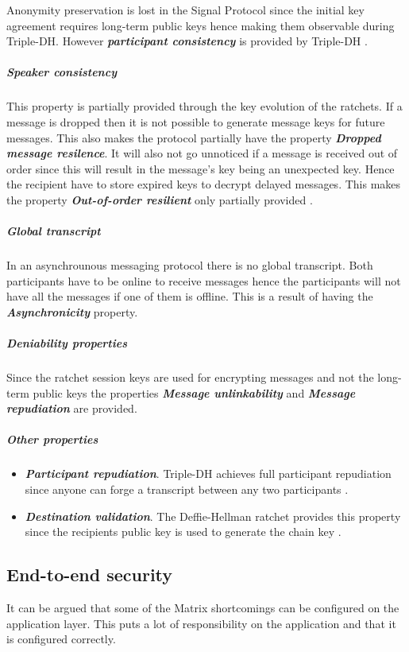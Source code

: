 Anonymity preservation is lost in the Signal Protocol since the initial key agreement requires long-term public keys hence making them observable during Triple-DH. However \textbf{\emph{participant consistency}} is provided by Triple-DH \cite{sok}. %

\subparagraph{Speaker consistency}
This property is partially provided through the key evolution of the ratchets. If a message is dropped then it is not possible to generate message keys for future messages. This also makes the protocol partially have the property \emph{\textbf{Dropped message resilence}}. It will also not go unnoticed if a message is received out of order since this will result in the message's key being an unexpected key. Hence the recipient have to store expired keys to decrypt delayed messages. This makes the property \emph{\textbf{Out-of-order resilient}} only partially provided \cite{sok}.

\subparagraph{Global transcript} 
In an asynchrounous messaging protocol there is no global transcript. Both participants have to be online to receive messages hence the participants will not have all the messages if one of them is offline. This is a result of having the \textbf{\emph{Asynchronicity}} property.

\subparagraph{Deniability properties}

Since the ratchet session keys are used for encrypting messages and not the long-term public keys the properties \textbf{\emph{Message unlinkability}} and \textbf{\emph{Message repudiation}} are provided. 


\subparagraph{Other properties}

\begin{itemize}
	\item \textbf{\emph{Participant repudiation}}. Triple-DH achieves full participant repudiation since anyone can forge a transcript between any two participants \cite{sok}.
	\item \textbf{\emph{Destination validation}}. The Deffie-Hellman ratchet provides this property since the recipients public key is used to generate the chain key \cite{sok}. %
\end{itemize}


\subsection{End-to-end security}
It can be argued that some of the Matrix shortcomings can be configured on the application layer. This puts a lot of responsibility on the application and that it is configured correctly. 

